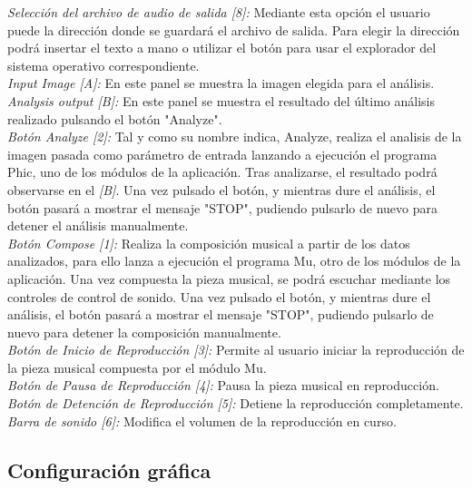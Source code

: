 		\noindent\textit{Selección del archivo de audio de salida [8]:}  Mediante esta opción el usuario puede la dirección donde se guardará el archivo de salida. Para elegir la dirección podrá insertar el texto a mano o utilizar el botón para usar el explorador del sistema operativo correspondiente.\\
		
		\noindent\textit{Input Image [A]:} En este panel se muestra la imagen elegida para el análisis.\\
		
		\noindent\textit{Analysis output [B]:} En este panel se muestra el resultado del último análisis realizado pulsando el botón "Analyze".\\
		
		\noindent\textit{Botón Analyze [2]:} Tal y como su nombre indica, Analyze, realiza el analisis de la imagen pasada como parámetro de entrada lanzando a ejecución el programa Phic, uno de los módulos de la aplicación. Tras analizarse, el resultado podrá observarse en el \textit{[B]}. Una vez pulsado el botón, y mientras dure el análisis, el botón pasará a mostrar el mensaje "STOP", pudiendo pulsarlo de nuevo para detener el análisis manualmente.\\
		
		\noindent\textit{Botón Compose [1]:} Realiza la composición musical a partir de los datos analizados, para ello lanza a ejecución el programa Mu, otro de los módulos de la aplicación. Una vez compuesta la pieza musical, se podrá escuchar mediante los controles de control de sonido. Una vez pulsado el botón, y mientras dure el análisis, el botón pasará a mostrar el mensaje "STOP", pudiendo pulsarlo de nuevo para detener la composición manualmente.\\
		
		\noindent\textit{Botón de Inicio de Reproducción [3]:} Permite al usuario iniciar la reproducción de la pieza musical compuesta por el módulo Mu.\\
		
		\noindent\textit{Botón de Pausa de Reproducción [4]:} Pausa la pieza musical en reproducción.\\
		
		\noindent\textit{Botón de Detención de Reproducción [5]:} Detiene la reproducción completamente.\\
		
		\noindent\textit{Barra de sonido [6]:} Modifica el volumen de la reproducción en curso.

		
	\subsection{Configuración gráfica}
		
